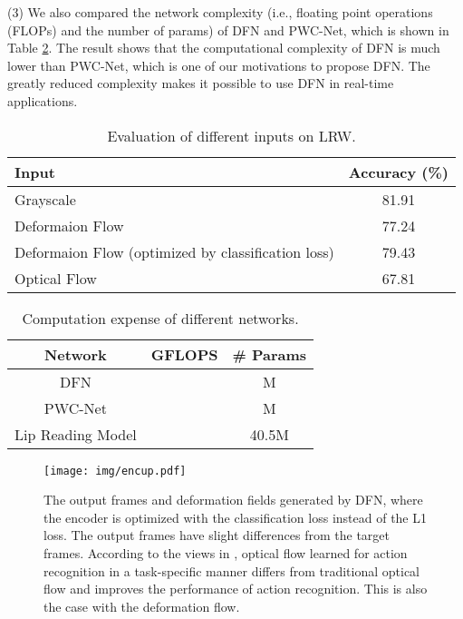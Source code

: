 \documentclass[a4paper, 10pt, conference]{ieeeconf}      \usepackage{FG2020}
\begin{document}
(3) We also compared the network complexity (i.e., floating point operations (FLOPs) and the number of params)  of DFN and PWC-Net, which is shown in Table \ref{table:complexity}. 
The result shows that the computational complexity of DFN is much lower than PWC-Net, which is one of our motivations to propose DFN.  The greatly reduced complexity makes it possible to use DFN in real-time applications. 

 


\begin{table}
   \caption{Evaluation of different inputs on LRW.}
   \label{tab:dfn_result}
   \begin{center}
   \begin{tabular}{|l|c|}
   \hline
   Input  & Accuracy  (\%)  \\
   \hline\hline
   Grayscale & 81.91 \\
   Deformaion Flow &  77.24\\
   Deformaion Flow (optimized by classification loss) & 79.43 \\
   Optical Flow& 67.81 \\
   \hline
   \end{tabular}
   \end{center}
   \vspace{-0.4cm}
   \end{table}
   

\begin{table}
\caption{Computation expense of different networks.}
     \label{table:complexity}
     \centering
       \begin{tabular}{|c|c|c|}
         \hline
         \textbf{Network} & \textbf{GFLOPS} & \textbf{\# Params} \\
         \hline
         \hline
         DFN &  & M\\
         \hline
         PWC-Net &  & M\\
         \hline
         Lip Reading Model &   & 40.5M\\  
         \hline            
       \end{tabular}
   \end{table}
   \vspace{-0.5cm}
 
   
 \begin{figure}
  \vspace{-0.6cm}
    \centering
    \texttt{[image: img/encup.pdf]}
    \caption{The output frames and deformation fields generated by DFN, where the encoder is optimized with the classification loss instead of the L1 loss. The output frames have slight differences from the target frames. According to the views in \cite{SevillaLara2017OnTI}, optical
    flow learned for action recognition in a task-specific manner differs from traditional optical flow and improves the performance of action recognition. This is also the case with the deformation flow.}
    \label{fig:encdoer}
    \vspace{-0.6cm}
    \end{figure}
\end{document}

